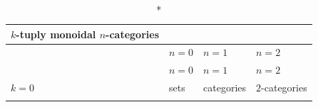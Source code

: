 \documentclass[12pt]{article}
\begin{document}
\newpage
\begin{longtable}[]{@{}llll@{}}
\caption*{\(k\)-tuply monoidal \(n\)-categories}\tabularnewline
\toprule
\begin{minipage}[b]{0.26\columnwidth}\raggedright
\strut
\end{minipage} & \begin{minipage}[b]{0.21\columnwidth}\raggedright
\(n=0\)\strut
\end{minipage} & \begin{minipage}[b]{0.21\columnwidth}\raggedright
\(n=1\)\strut
\end{minipage} & \begin{minipage}[b]{0.21\columnwidth}\raggedright
\(n=2\)\strut
\end{minipage}\tabularnewline
\midrule
\endfirsthead
\toprule
\begin{minipage}[b]{0.26\columnwidth}\raggedright
\strut
\end{minipage} & \begin{minipage}[b]{0.21\columnwidth}\raggedright
\(n=0\)\strut
\end{minipage} & \begin{minipage}[b]{0.21\columnwidth}\raggedright
\(n=1\)\strut
\end{minipage} & \begin{minipage}[b]{0.21\columnwidth}\raggedright
\(n=2\)\strut
\end{minipage}\tabularnewline
\midrule
\endhead
\begin{minipage}[t]{0.26\columnwidth}\raggedright
\(k=0\)\strut
\end{minipage} & \begin{minipage}[t]{0.21\columnwidth}\raggedright
sets\strut
\end{minipage} & \begin{minipage}[t]{0.21\columnwidth}\raggedright
categories\strut
\end{minipage} & \begin{minipage}[t]{0.21\columnwidth}\raggedright
\(2\)-categories\strut
\end{minipage}\tabularnewline
\begin{minipage}[t]{0.26\columnwidth}\raggedright
\strut
\end{minipage} & \begin{minipage}[t]{0.21\columnwidth}\raggedright
\strut
\end{minipage} & \begin{minipage}[t]{0.21\columnwidth}\raggedright
\strut
\end{minipage} & \begin{minipage}[t]{0.21\columnwidth}\raggedright

\end{minipage}
\end{longtable}
\end{document}
